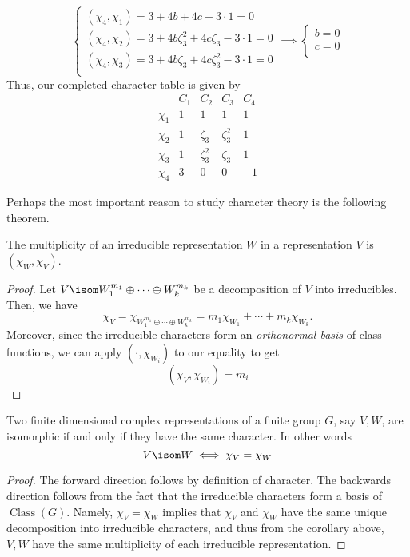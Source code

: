 \documentclass[11pt,leqno,oneside]{amsbook}
\newcommand{\Class}{\operatorname{Class}}
\numberwithin{thm}{section}
\begin{document}
\begin{example}
\[    \begin{cases}
      (\chi_4,\chi_1) = 3 + 4b+4c-3\cdot1 = 0\\
      (\chi_4,\chi_2) = 3+4b\zeta_3^2+4c\zeta_3-3\cdot1 = 0\\
      (\chi_4,\chi_3) = 3+4b\zeta_3+4c\zeta_3^2-3\cdot1 = 0\\
    \end{cases}
    \implies
    \begin{cases}
      b = 0 \\
      c = 0\\
    \end{cases}
  \]
  Thus, our completed character table is given by \[
    \begin{array}{c|cccc}
      &C_1&C_2&C_3&C_4 \\
      \hline
      \chi_1 & 1 & 1 & 1 & 1\\
      \chi_2 & 1 & \zeta_3 & \zeta_3^2 & 1\\
      \chi_3 & 1 & \zeta_3^2 & \zeta_3 & 1\\
      \chi_4 & 3 & 0 & 0 & -1
    \end{array}
  \]
\end{example}
Perhaps the most important reason to study character theory is the
following theorem.
\begin{cor}
  The multiplicity of an irreducible representation \(W\) in a
  representation \(V\) is \((\chi_W, \chi_V)\). 
\end{cor}
\begin{proof}
  Let \(V \isom W_1^{m_1} \oplus \cdots \oplus W_k^{m_k}\) be a
  decomposition of \(V\) into irreducibles. Then, we have \[
    \chi_V = \chi_{W_1^{m_1} \oplus \cdots \oplus W_k^{m_k}} = m_1
    \chi_{W_1} + \cdots + m_k \chi_{W_k}.
  \]
  Moreover, since the irreducible characters form an \emph{orthonormal
  basis} of class functions, we can apply \((\cdot, \chi_{W_i})\) to
  our equality to get \[
    (\chi_V, \chi_{W_i}) = m_i
  \]
\end{proof}
\begin{cor}
  Two finite dimensional complex representations of a finite group
  \(G\), say \(V,W\), are isomorphic if and only if they have the same
  character. In other words \[
    V \isom W \iff \chi_V = \chi_W
  \]
\end{cor}
\begin{proof}
  The forward direction follows by definition of character. The
  backwards direction follows from the fact that the irreducible characters form a
  basis of \(\Class(G)\). Namely, \(\chi_V = \chi_W\) implies that
  \(\chi_V\) and \(\chi_W\) have the same unique decomposition into
  irreducible characters, and thus from the corollary above, \(V,W\) have the
  same multiplicity of each irreducible representation.
\end{proof}
\end{document}
